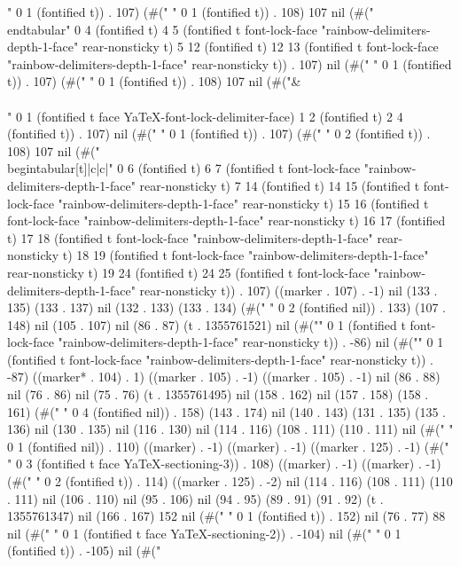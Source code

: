 " 0 1 (fontified t)) . 107) (#(" " 0 1 (fontified t)) . 108) 107 nil (#("\\end{tabular}" 0 4 (fontified t) 4 5 (fontified t font-lock-face "rainbow-delimiters-depth-1-face" rear-nonsticky t) 5 12 (fontified t) 12 13 (fontified t font-lock-face "rainbow-delimiters-depth-1-face" rear-nonsticky t)) . 107) nil (#("
" 0 1 (fontified t)) . 107) (#(" " 0 1 (fontified t)) . 108) 107 nil (#("& \\\\" 0 1 (fontified t face YaTeX-font-lock-delimiter-face) 1 2 (fontified t) 2 4 (fontified t)) . 107) nil (#("
" 0 1 (fontified t)) . 107) (#("  " 0 2 (fontified t)) . 108) 107 nil (#("\\begin{tabular}[t]{|c|c|}" 0 6 (fontified t) 6 7 (fontified t font-lock-face "rainbow-delimiters-depth-1-face" rear-nonsticky t) 7 14 (fontified t) 14 15 (fontified t font-lock-face "rainbow-delimiters-depth-1-face" rear-nonsticky t) 15 16 (fontified t font-lock-face "rainbow-delimiters-depth-1-face" rear-nonsticky t) 16 17 (fontified t) 17 18 (fontified t font-lock-face "rainbow-delimiters-depth-1-face" rear-nonsticky t) 18 19 (fontified t font-lock-face "rainbow-delimiters-depth-1-face" rear-nonsticky t) 19 24 (fontified t) 24 25 (fontified t font-lock-face "rainbow-delimiters-depth-1-face" rear-nonsticky t)) . 107) ((marker . 107) . -1) nil (133 . 135) (133 . 137) nil (132 . 133) (133 . 134) (#("  " 0 2 (fontified nil)) . 133) (107 . 148) nil (105 . 107) nil (86 . 87) (t . 1355761521) nil (#("{" 0 1 (fontified t font-lock-face "rainbow-delimiters-depth-1-face" rear-nonsticky t)) . -86) nil (#("}" 0 1 (fontified t font-lock-face "rainbow-delimiters-depth-1-face" rear-nonsticky t)) . -87) ((marker* . 104) . 1) ((marker . 105) . -1) ((marker . 105) . -1) nil (86 . 88) nil (76 . 86) nil (75 . 76) (t . 1355761495) nil (158 . 162) nil (157 . 158) (158 . 161) (#("    " 0 4 (fontified nil)) . 158) (143 . 174) nil (140 . 143) (131 . 135) (135 . 136) nil (130 . 135) nil (116 . 130) nil (114 . 116) (108 . 111) (110 . 111) nil (#("
" 0 1 (fontified nil)) . 110) ((marker) . -1) ((marker) . -1) ((marker . 125) . -1) (#("
  " 0 3 (fontified t face YaTeX-sectioning-3)) . 108) ((marker) . -1) ((marker) . -1) (#("  " 0 2 (fontified t)) . 114) ((marker . 125) . -2) nil (114 . 116) (108 . 111) (110 . 111) nil (106 . 110) nil (95 . 106) nil (94 . 95) (89 . 91) (91 . 92) (t . 1355761347) nil (166 . 167) 152 nil (#("
" 0 1 (fontified t)) . 152) nil (76 . 77) 88 nil (#("
" 0 1 (fontified t face YaTeX-sectioning-2)) . -104) nil (#(" " 0 1 (fontified t)) . -105) nil (#("
